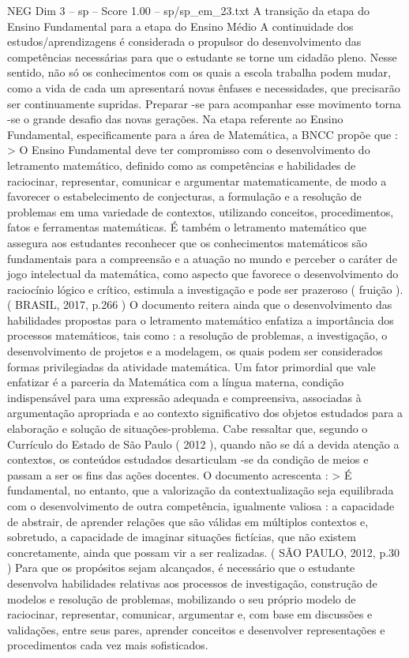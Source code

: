 \begin{textsample}{NEG Dim 3 – sp – Score 1.00 – sp/sp\_em\_23.txt}  \label{ex:f3_neg_089}
A transição da etapa do Ensino Fundamental para a etapa do Ensino Médio A continuidade dos estudos/aprendizagens é considerada o propulsor do desenvolvimento das competências necessárias para que o estudante se torne um cidadão pleno.
Nesse sentido, não só os conhecimentos com os quais a escola trabalha podem mudar, como a vida de cada um apresentará novas ênfases e necessidades, que precisarão ser continuamente supridas.
Preparar -se para acompanhar esse movimento torna -se o grande desafio das novas gerações.
Na etapa referente ao Ensino Fundamental, especificamente para a área de Matemática, a BNCC propõe que : > O Ensino Fundamental deve ter compromisso com o desenvolvimento do letramento matemático, definido como as competências e habilidades de raciocinar, representar, comunicar e argumentar matematicamente, de modo a favorecer o estabelecimento de conjecturas, a formulação e a resolução de problemas em uma variedade de contextos, utilizando conceitos, procedimentos, fatos e ferramentas matemáticas.
É também o letramento matemático que assegura aos estudantes reconhecer que os conhecimentos matemáticos são fundamentais para a compreensão e a atuação no mundo e perceber o caráter de jogo intelectual da matemática, como aspecto que favorece o desenvolvimento do raciocínio lógico e crítico, estimula a investigação e pode ser prazeroso ( fruição ). ( BRASIL, 2017, p.266 ) O documento reitera ainda que o desenvolvimento das habilidades propostas para o letramento matemático enfatiza a importância dos processos matemáticos, tais como : a resolução de problemas, a investigação, o desenvolvimento de projetos e a modelagem, os quais podem ser considerados formas privilegiadas da atividade matemática.
Um fator primordial que vale enfatizar é a parceria da Matemática com a língua materna, condição indispensável para uma expressão adequada e compreensiva, associadas à argumentação apropriada e ao contexto significativo dos objetos estudados para a elaboração e solução de situações-problema.
Cabe ressaltar que, segundo o Currículo do Estado de São Paulo ( 2012 ), quando não se dá a devida atenção a contextos, os conteúdos estudados desarticulam -se da condição de meios e passam a ser os fins das ações docentes.
O documento acrescenta : > É fundamental, no entanto, que a valorização da contextualização seja equilibrada com o desenvolvimento de outra competência, igualmente valiosa : a capacidade de abstrair, de aprender relações que são válidas em múltiplos contextos e, sobretudo, a capacidade de imaginar situações fictícias, que não existem concretamente, ainda que possam vir a ser realizadas. ( SÃO PAULO, 2012, p.30 ) Para que os propósitos sejam alcançados, é necessário que o estudante desenvolva habilidades relativas aos processos de investigação, construção de modelos e resolução de problemas, mobilizando o seu próprio modelo de raciocinar, representar, comunicar, argumentar e, com base em discussões e validações, entre seus pares, aprender conceitos e desenvolver representações e procedimentos cada vez mais sofisticados.

\end{textsample}
